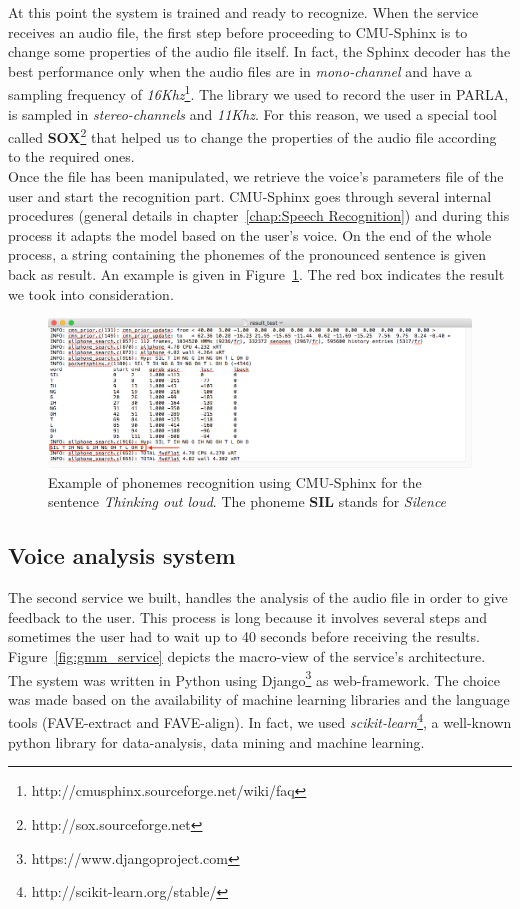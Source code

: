 \noindent At this point the system is trained and ready to recognize. When the service receives an audio file, the first step before proceeding to CMU-Sphinx is to change some properties of the audio file itself. In fact, the Sphinx decoder has the best performance only when the audio files are in \textit{mono-channel} and have a sampling frequency of \textit{16Khz}\footnote{http://cmusphinx.sourceforge.net/wiki/faq}. The library we used to record the user in PARLA, is sampled in \textit{stereo-channels} and \textit{11Khz}. For this reason, we used a special tool called \textbf{SOX}\footnote{http://sox.sourceforge.net} that helped us to change the properties of the audio file according to the required ones. \\

\noindent Once the file has been manipulated, we retrieve the voice's parameters file of the user and start the recognition part. CMU-Sphinx goes through several internal procedures (general details in chapter~\ref{chap:Speech Recognition}) and during this process it adapts the model based on the user's voice. On the end of the whole process, a string containing the phonemes of the pronounced sentence is given back as result. An example is given in Figure~\ref{fig:result_sphinx}. The red box indicates the result we took into consideration.

\begin{figure}[!ht]
	\centering
	\includegraphics[scale=0.5]{Figures/result_sphinx.png}
	\caption{Example of phonemes recognition using CMU-Sphinx for the sentence \textit{Thinking out loud}. The phoneme \textbf{SIL} stands for \textit{Silence}}
	\label{fig:result_sphinx}
\end{figure}

\subsection{Voice analysis system}
\label{ssec:training_gmm}

The second service we built, handles the analysis of the audio file in order to give feedback to the user. This process is long because it involves several steps and sometimes the user had to wait up to 40 seconds before receiving the results. Figure~\ref{fig:gmm_service} depicts the macro-view of the service's architecture. \\
\noindent The system was written in Python using Django\footnote{https://www.djangoproject.com} as web-framework. The choice was made based on the availability of machine learning libraries and the language tools (FAVE-extract and FAVE-align). In fact, we used \textit{scikit-learn}\footnote{http://scikit-learn.org/stable/}, a well-known python library for data-analysis, data mining and machine learning. \\

